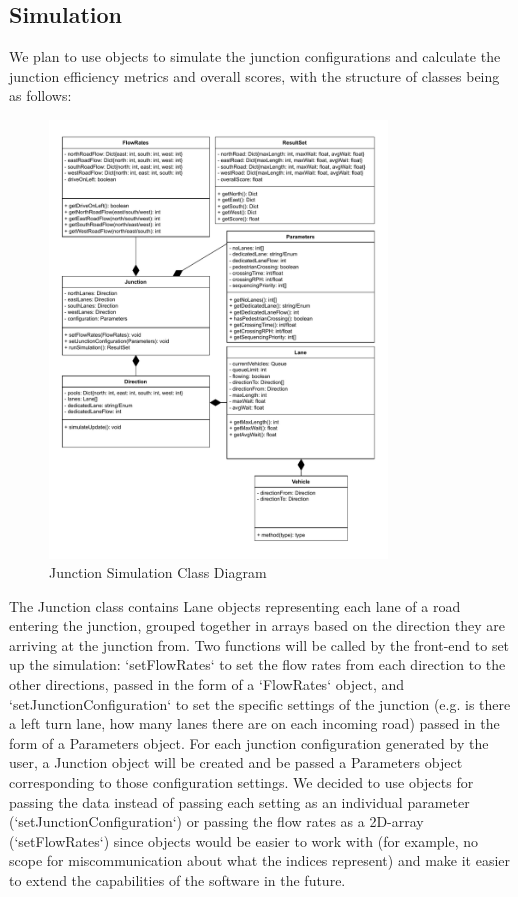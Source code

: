 \documentclass{article}
\begin{document}
\subsection{Simulation}

We plan to use objects to simulate the junction configurations and calculate 
the junction efficiency metrics and overall scores, with the structure of classes being as follows:

\begin{figure}[H]
    \centering
    \includegraphics[width=0.8\textwidth]{JunctionSimulationClassDiagram.drawio.pdf}
    \caption{Junction Simulation Class Diagram}
    \label{class diagram}
\end{figure}

The Junction class contains Lane objects representing each lane of a road entering the junction, grouped together in arrays based on 
the direction they are arriving at the junction from. Two functions will be called by the front-end to set up the simulation: `setFlowRates` 
to set the flow rates from each direction to the other directions, passed in the form of a `FlowRates` object, and `setJunctionConfiguration` 
to set the specific settings of the junction (e.g. is there a left turn lane, how many lanes there are on each incoming road) passed in 
the form of a Parameters object. For each junction configuration generated by the user, a Junction object will be created and be passed 
a Parameters object corresponding to those configuration settings. We decided to use objects for passing the data instead of passing each 
setting as an individual parameter (`setJunctionConfiguration`) or passing the flow rates as a 2D-array (`setFlowRates`) since objects would 
be easier to work with (for example, no scope for miscommunication about what the indices represent) and make it easier to extend the 
capabilities of the software in the future.
\end{document}
